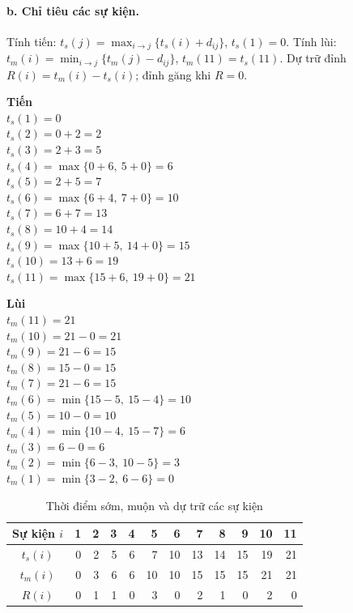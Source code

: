 \documentclass[12pt,a4paper]{article}
\begin{document}
\paragraph{b. Chỉ tiêu các sự kiện.}
Tính tiến: $t_s(j)=\max_{i\rightarrow j}\{t_s(i)+d_{ij}\}$, $t_s(1)=0$.
Tính lùi: $t_m(i)=\min_{i\rightarrow j}\{t_m(j)-d_{ij}\}$, $t_m(11)=t_s(11)$.
Dự trữ đỉnh $R(i)=t_m(i)-t_s(i)$; đỉnh găng khi $R=0$.

{\small
\begin{minipage}[t]{0.49\textwidth}
\textbf{Tiến}\\[1pt]
$t_s(1)=0$\\
$t_s(2)=0+2=2$\\
$t_s(3)=2+3=5$\\
$t_s(4)=\max\{0+6,\ 5+0\}=6$\\
$t_s(5)=2+5=7$\\
$t_s(6)=\max\{6+4,\ 7+0\}=10$\\
$t_s(7)=6+7=13$\\
$t_s(8)=10+4=14$\\
$t_s(9)=\max\{10+5,\ 14+0\}=15$\\
$t_s(10)=13+6=19$\\
$t_s(11)=\max\{15+6,\ 19+0\}=21$
\end{minipage}
\hfill
\begin{minipage}[t]{0.49\textwidth}
\textbf{Lùi}\\[1pt]
$t_m(11)=21$\\
$t_m(10)=21-0=21$\\
$t_m(9)=21-6=15$\\
$t_m(8)=15-0=15$\\
$t_m(7)=21-6=15$\\
$t_m(6)=\min\{15-5,\ 15-4\}=10$\\
$t_m(5)=10-0=10$\\
$t_m(4)=\min\{10-4,\ 15-7\}=6$\\
$t_m(3)=6-0=6$\\
$t_m(2)=\min\{6-3,\ 10-5\}=3$\\
$t_m(1)=\min\{3-2,\ 6-6\}=0$
\end{minipage}
}

\begin{table}[H]\centering
\caption{Thời điểm sớm, muộn và dự trữ các sự kiện}
\small
\begin{tabular}{c|rrrrrrrrrrr}
\toprule
Sự kiện $i$ & 1 & 2 & 3 & 4 & 5 & 6 & 7 & 8 & 9 & 10 & 11\\
\midrule
$t_s(i)$ & 0 & 2 & 5 & 6 & 7 & 10 & 13 & 14 & 15 & 19 & 21\\
$t_m(i)$ & 0 & 3 & 6 & 6 & 10 & 10 & 15 & 15 & 15 & 21 & 21\\
$R(i)$   & 0 & 1 & 1 & 0 & 3 & 0 & 2 & 1 & 0 & 2 & 0\\
\bottomrule
\end{tabular}
\end{table}
\end{document}
